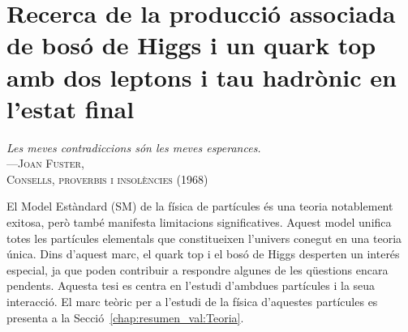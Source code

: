 
\lhead[{\bfseries \thepage}]{ \rightmark}

\label{partIII}


 \renewcommand\thesection{%
 \ifnum\value{betasect}=1%
A%
 \else
\ifnum\value{betasect}=2%
B%
\else
\ifnum\value{betasect}=3%
C%
\else
\ifnum\value{betasect}=4%
D%
\else
 \arabic{section}%
 \fi\fi\fi\fi}%

 \newenvironment{asection}{%
 \setcounter{betasect}{1}%
 }{%
 \setcounter{betasect}{0}%
 }%

 \newenvironment{bsection}{%
 \setcounter{betasect}{2}%
 }{%
 \setcounter{betasect}{0}%
 }%


\setcounter{section}{0}

\chapter*{Recerca de la producció associada de bosó de Higgs i un quark top amb dos leptons i tau hadrònic en l'estat final}
\label{chap:resumen_val}


\hspace*{90pt} \textit{Les meves contradiccions són les meves esperances.} \\
\hspace*{140pt} ---\textsc{Joan Fuster,} \\%
\hspace*{160pt} \textsc{Consells, proverbis i insolències (1968)} \\%
\vspace*{2cm} 


El Model Estàndard (SM) de la física de partícules és una teoria notablement exitosa, 
però també manifesta limitacions significatives. Aquest model unifica totes les partícules 
elementals que constitueixen l'univers conegut en una teoria única. Dins d'aquest marc, 
el quark $\text{top}$ i el bosó de Higgs desperten un interés especial, ja que poden 
contribuir a respondre algunes de les qüestions encara pendents. Aquesta tesi es 
centra en l'estudi d'ambdues partícules i la seua interacció. El
marc teòric per a l'estudi de la física d'aquestes partícules es presenta a
la Secció~\ref{chap:resumen_val:Teoria}.

